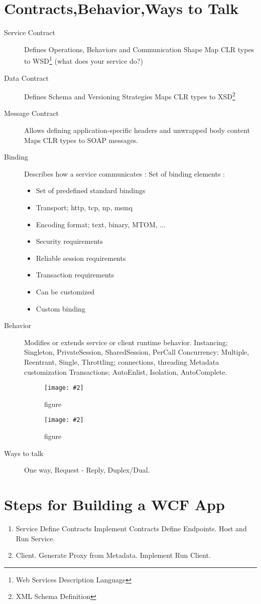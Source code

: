 \documentclass[a4paper,10pt]{scrreprt}
\newcommand{\pic}[2][figure]{\begin{figure}[h]
 \centering
 \texttt{[image: \#2]}
 \caption{#1}
\end{figure}
}
\begin{document}
\section{Contracts,Behavior,Ways to Talk}
\begin{description}
 \item [Service Contract] Defines Operations, 
Behaviors and Communication Shape Map CLR types to WSD\footnote{Web Services Description Language} (what does your 
service do?)
\item [Data Contract] Defines Schema and Versioning Strategies Maps CLR types to XSD\footnote{XML Schema Definition}
\item [Message Contract] Allows defining application-specific headers and unwrapped body content Maps CLR types to SOAP 
messages.
\item[Binding] Describes how a service communicates : Set of binding elements :
\begin{itemize}
 \item Set of predefined standard bindings
\item Transport; http, tcp, np, msmq
\item Encoding format; text, binary, MTOM, ...
\item Security requirements
\item Reliable session requirements
\item Transaction requirements
\item Can be customized
\item Custom binding
\end{itemize}
\item[Behavior] Modifies or extends service or client runtime
behavior. Instancing; Singleton, PrivateSession,
SharedSession, PerCall  Concurrency; Multiple, Reentrant, Single, Throttling; connections, threading Metadata 
customization Transactions; AutoEnlist, Isolation, AutoComplete.
\pic{bbe.png}
\pic{bbs.png}
\item[Ways to talk] One way, Request - Reply, Duplex/Dual.
\end{description}

\section{Steps for Building a WCF App}
\begin{enumerate}
 \item Service
 \subitem Define Contracts
 \subitem Implement Contracts
  \subitem Define Endpoints. 
  \subitem Host and Run Service.
  \item Client.
  \subitem Generate Proxy from Metadata.
  \subitem Implement Run Client.
\end{enumerate}
\end{document}
